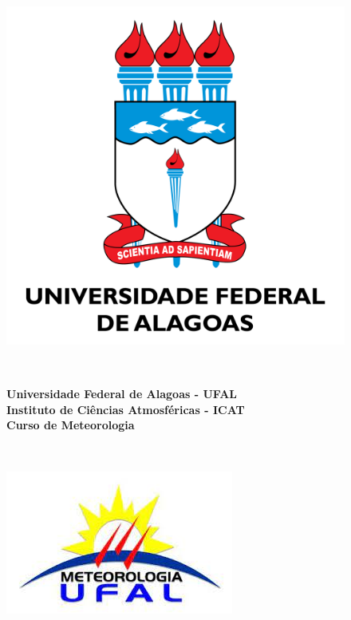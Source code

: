 \begin{titlepage}
\begin{figure}
	\centering
	\begin{minipage}{.1\textwidth}
		\includegraphics[scale=0.1]{UFAL.png}
	\end{minipage}~~
	\begin{minipage}{.7\textwidth}
		\centering
		\textbf{\large Universidade Federal de Alagoas - UFAL}\\
    	\vspace{2mm}
		\textbf{\large Instituto de Ciências Atmosféricas - ICAT}\\
    	\vspace{2mm}
		\textbf{\large Curso de Meteorologia}\\
	\end{minipage}~~
	\begin{minipage}{.1\textwidth}
		\includegraphics[scale=0.3]{ICAT.jpg}
	\end{minipage}
    \vspace{2cm}
\end{figure}


\end{titlepage}

